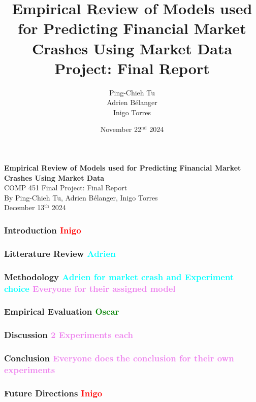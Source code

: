 \documentclass[12pt, letterpaper]{article}
\title{Empirical Review of Models used for Predicting Financial Market Crashes Using Market Data \\[1em] \large Project: Final Report}
\author{\normalsize Ping-Chieh Tu \\ Adrien Bélanger \\ Inigo Torres}
\date{\vspace{2em} November 22$^{\text{nd}}$ 2024}
\begin{document}
\begin{titlepage}
    \centering
    \vspace*{2in}
    {\LARGE \textbf{Empirical Review of Models used for Predicting Financial Market Crashes Using Market Data}}\\
    \vspace*{0.5in}
    {\large COMP 451 Final Project: Final Report}\\[4in]
    \normalsize
    By Ping-Chieh Tu, Adrien Bélanger, Inigo Torres \\ [3em]
    December 13$^{\text{th}}$ 2024
\end{titlepage}
\pagebreak

\subsubsection*{Introduction \textcolor{red}{Inigo}}

\subsubsection*{Litterature Review \textcolor{cyan}{Adrien}}

\subsubsection*{Methodology \textcolor{cyan}{Adrien for market crash and Experiment choice} \textcolor{violet}{Everyone for their assigned model}}

\subsubsection*{Empirical Evaluation \textcolor{green}{Oscar}}

\subsubsection*{Discussion \textcolor{violet}{2 Experiments each}}



\subsubsection*{Conclusion \textcolor{violet}{Everyone does the conclusion for their own experiments}}

\subsubsection*{Future Directions \textcolor{red}{Inigo}}
\end{document}
